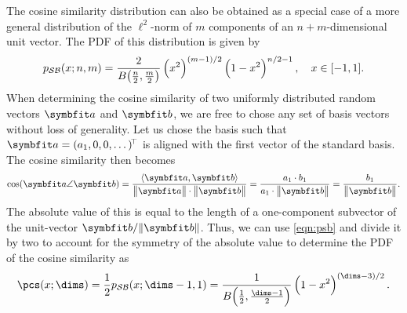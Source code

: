 The cosine similarity distribution can also be obtained as a special case of a more general distribution of the $\ell^2$-norm of $m$ components of an $n+m$-dimensional unit vector.
The PDF of this distribution is given by \textcite{harman2010,gosmann216}
\begin{equation}
    p_{\mathcal{SB}}(x; n, m) = \frac{2}{B\!\del{\frac{n}{2}, \frac{m}{2}}} \del{x^2}^{(m-1)/2} \del{1 - x^2}^{n/2 - 1},\quad x \in [-1, 1] \text{.}\label{eqn:psb}
\end{equation}
When determining the cosine similarity of two uniformly distributed random vectors $\vc a$ and $\vc b$, we are free to chose any set of basis vectors without loss of generality.
Let us chose the basis such that $\vc a = (a_1, 0, 0, \dots)\!\Tr$ is aligned with the first vector of the standard basis.
The cosine similarity then becomes
\begin{equation}
    \cos(\vc a \angle \vc b) = \frac{\langle \vc a, \vc b \rangle}{\big\|\vc a\big\| \cdot \big\|\vc b\big\|} = \frac{a_1 \cdot b_1}{a_1 \cdot \big\|\vc b\big\|} = \frac{b_1}{\big\|\vc b\big\|} \text{.}
\end{equation}
The absolute value of this is equal to the length of a one-component subvector of the unit-vector $\vc b/\norm{\vc b}$.
Thus, we can use \cref{eqn:psb} and divide it by two to account for the symmetry of the absolute value to determine the PDF of the cosine similarity as
\begin{equation}
    \pcs(x; \dims) = \frac{1}{2} p_{\mathcal{SB}}(x; \dims - 1, 1) = \frac{1}{B\!\del{\frac{1}{2}, \frac{\dims - 1}{2}}} \del{1 - x^2}^{\del{\dims - 3}/2}\text{.}
\end{equation}
